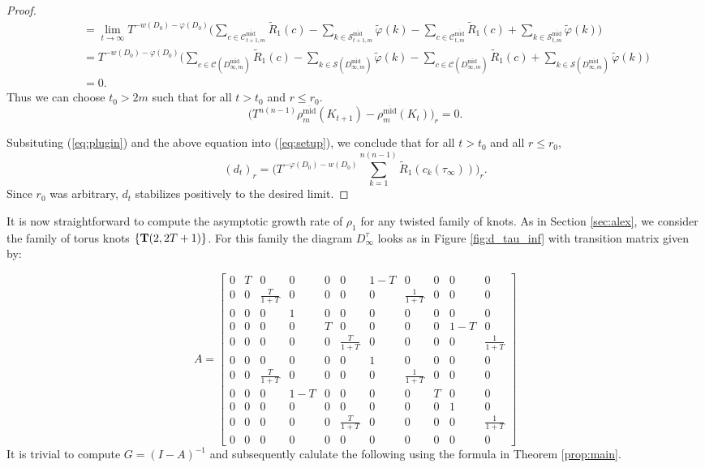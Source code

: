 \documentclass[11pt,hyp,]{nyjm}
\numberwithin{thm}{section}
\theoremstyle{definition}
\theoremstyle{remark}
\begin{document}
\begin{proof}
\begin{align*}
		& \ \ \ \ \ = \lim_{t \to \infty}  T^{-w(D_0) - \varphi(D_0)}\big(\sum_{c \in \mathcal{C}_{{t+1},m}^{\overline{\text{mid}}}} \tilde{R}_1(c) - \sum_{k \in \mathcal{S}_{{t+1},m}^{\overline{\text{mid}}}} \tilde{\varphi}(k) - \sum_{c \in \mathcal{C}_{t,m}^{\overline{\text{mid}}}} \tilde{R}_1(c) + \sum_{k \in \mathcal{S}_{t,m}^{\overline{\text{mid}}}} \tilde{\varphi}(k) \big) \\
		& \ \ \ \ \ = T^{-w(D_0) - \varphi(D_0)}\big(\sum_{c \in \mathcal{C}(D^{\overline{\text{mid}}}_{\infty,m})} \tilde{R}_1(c) - \sum_{k \in \mathcal{S}(D^{\overline{\text{mid}}}_{\infty,m})} \tilde{\varphi}(k) - \sum_{c \in \mathcal{C}(D^{\overline{\text{mid}}}_{\infty,m})} \tilde{R}_1(c) + \sum_{k \in \mathcal{S}(D^{\overline{\text{mid}}}_{\infty,m})} \tilde{\varphi}(k) \big) \\
		& \ \ \ \ \ = 0.
		\end{align*}
		Thus we can choose $t_0 > 2m$ such that for all $t > t_0$ and $r \leq r_0$.
		$$
		\big( T^{n(n - 1)} \rho^{\overline{\text{mid}}}_m(K_{t + 1}) -  \rho^{\overline{\text{mid}}}_m(K_t) \big)_r = 0.
		$$
		
		Subsituting (\ref{eq:plugin}) and the above equation into (\ref{eq:setup}), we conclude that for all $t > t_0$ and all $r \leq r_0$,
		$$
		(d_t)_r = \Big(T^{-\varphi(D_0) -w(D_0)} \sum_{k = 1}^{n(n-1)} \widetilde{R}_1(c_k(\tau_\infty)) \Big)_r.
		$$
		Since $r_0$ was arbitrary, $d_t$ stabilizes positively to the desired limit.
	\end{proof}

	It is now straightforward to compute the asymptotic growth rate of $\rho_1$ for any twisted family of knots. As in Section \ref{sec:alex}, we consider the family of torus knots $\{{\bf T}(2,2T+1)\}$. For this family the diagram $D^\tau_\infty$ looks as in Figure \ref{fig:d_tau_inf} with transition matrix given by:

	$$
	A = \begin{bmatrix}
		0 & T & 0 & 0 & 0 & 0 & 1 - T & 0 & 0 & 0 & 0 \\
		0 & 0 & \frac{T}{1 + T} & 0 & 0 & 0 & 0 & \frac{1}{1 + T} & 0 & 0 & 0 \\
		0 & 0 & 0 & 1 & 0 & 0 & 0 & 0 & 0 & 0 & 0 \\
		0 & 0 & 0 & 0 & T & 0 & 0 & 0 & 0 & 1 - T & 0 \\
		0 & 0 & 0 & 0 & 0 & \frac{T}{1 + T} & 0 & 0 & 0 & 0 & \frac{1}{1 + T} \\
		0 & 0 & 0 & 0 & 0 & 0 & 1 & 0 & 0 & 0 & 0 \\
		0 & 0 & \frac{T}{1 + T} & 0 & 0 & 0 & 0 & \frac{1}{1 + T} & 0 & 0 & 0 \\
		0 & 0 & 0 & 1 - T & 0 & 0 & 0 & 0 & T & 0 & 0 \\
		0 & 0 & 0 & 0 & 0 & 0 & 0 & 0 & 0 & 1& 0 \\
		0 & 0 & 0 & 0 & 0 & \frac{T}{1 + T} & 0 & 0 & 0 & 0 & \frac{1}{1 + T} \\
		0 & 0 & 0 & 0 & 0 & 0 & 0 & 0 & 0 & 0 & 0 
	\end{bmatrix}
	$$
	It is trivial to compute $G = (I - A)^{-1}$ and subsequently calulate the following using the formula in Theorem \ref{prop:main}.
	
\end{document}

